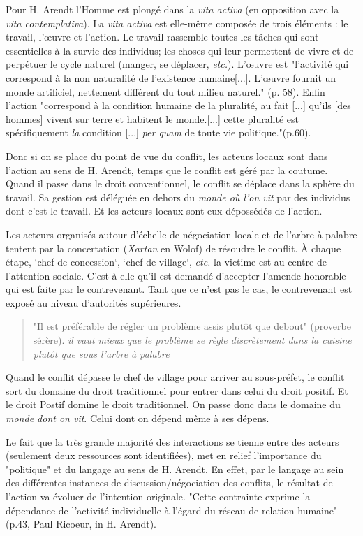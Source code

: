 Pour H. Arendt\cite{arendt_condition_2020} l'Homme est plongé dans la \textit{vita activa} (en opposition avec la \textit{vita contemplativa}). La \textit{vita activa} est elle-même composée de trois éléments : le travail, l'\oe{}uvre et l'action. Le travail rassemble toutes les tâches qui sont essentielles à la survie des individus; les choses qui leur permettent de vivre et de perpétuer le cycle naturel (manger, se déplacer, \textit{etc.}). L'\oe{}uvre est "l'activité qui correspond à la non naturalité de l'existence humaine[...]. L'\oe{}uvre fournit un monde artificiel, nettement différent du tout milieu naturel." (p. 58). Enfin l'action "correspond à la condition humaine de la pluralité, au fait [...] qu'ils [des hommes] vivent sur terre et habitent le monde.[...] cette pluralité est spécifiquement \textit{la} condition [...] \textit{per quam} de toute vie politique."(p.60).

Donc si on se place du point de vue du conflit, les acteurs locaux sont dans l'action au sens de H. Arendt, temps que le conflit est géré par la coutume. Quand il passe dans le droit conventionnel, le conflit se déplace dans la sphère du travail. Sa gestion est déléguée en dehors du \textit{monde où l'on vit} par des individus dont c'est le travail. Et les acteurs locaux sont eux dépossédés de l'action.

Les acteurs organisés autour d’échelle de négociation locale et de l'arbre à palabre tentent par la concertation (\textit{Xartan} en Wolof) de résoudre le conflit. À chaque étape, `chef de concession`, `chef de village`, \textit{etc.} la victime est au centre de l'attention sociale. C'est à elle qu'il est demandé d'accepter l'amende honorable qui est faite par le contrevenant. Tant que ce n'est pas le cas, le contrevenant est exposé au niveau d'autorités supérieures.

\begin{quote}
    "Il est préférable de régler un problème assis plutôt que debout" (proverbe sérère). \textit{il vaut mieux que le problème se règle discrètement dans la cuisine plutôt que sous l'arbre à palabre}
\end{quote}


Quand le conflit dépasse le chef de village pour arriver au sous-préfet, le conflit sort du domaine du droit traditionnel pour entrer dans celui du droit positif. Et le droit Postif domine le droit traditionnel. On passe donc dans le domaine du \textit{monde dont on vit}. Celui dont on dépend même à ses dépens.

Le fait que la très grande majorité des interactions se tienne  entre des  acteurs (seulement deux ressources sont identifiées), met en relief l'importance du "politique" et du langage au sens de H. Arendt\cite{arendt_condition_2020}. En effet, par le langage au sein des différentes instances de discussion/négociation des conflits, le résultat de l'action va évoluer de l'intention originale. "Cette contrainte exprime la dépendance de l'activité individuelle à l'égard du réseau de relation humaine" (p.43, Paul Ricoeur, in H. Arendt\cite{arendt_condition_2020}).

